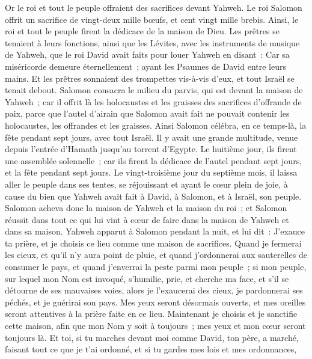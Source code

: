 \begin{multicols}{2}
Or le roi et tout le peuple offraient des sacrifices devant Yahweh.
Le roi Salomon offrit un sacrifice de vingt-deux mille bœufs, et cent vingt mille brebis. Ainsi, le roi et tout le peuple firent la dédicace de la maison de Dieu.
Les prêtres se tenaient à leurs fonctions, ainsi que les Lévites, avec les instruments de musique de Yahweh, que le roi David avait faits pour louer Yahweh en disant~: Car sa miséricorde demeure éternellement~; ayant les Psaumes de David entre leurs mains. Et les prêtres sonnaient des trompettes vis-à-vis d'eux, et tout Israël se tenait debout.
Salomon consacra le milieu du parvis, qui est devant la maison de Yahweh~; car il offrit là les holocaustes et les graisses des sacrifices d'offrande de paix, parce que l'autel d'airain que Salomon avait fait ne pouvait contenir les holocaustes, les offrandes et les graisses.
Ainsi Salomon célébra, en ce temps-là, la fête pendant sept jours, avec tout Israël. Il y avait une grande multitude, venue depuis l'entrée d'Hamath jusqu'au torrent d'Egypte.
Le huitième jour, ils firent une assemblée solennelle~; car ils firent la dédicace de l'autel pendant sept jours, et la fête pendant sept jours.
Le vingt-troisième jour du septième mois, il laissa aller le peuple dans ses tentes, se réjouissant et ayant le cœur plein de joie, à cause du bien que Yahweh avait fait à David, à Salomon, et à Israël, son peuple.
Salomon acheva donc la maison de Yahweh et la maison du roi~; et Salomon réussit dans tout ce qui lui vint à cœur de faire dans la maison de Yahweh et dans sa maison.
Yahweh apparut à Salomon pendant la nuit, et lui dit~: J'exauce ta prière, et je choisis ce lieu comme une maison de sacrifices.
Quand je fermerai les cieux, et qu'il n'y aura point de pluie, et quand j'ordonnerai aux sauterelles de consumer le pays, et quand j'enverrai la peste parmi mon peuple~;
si mon peuple, sur lequel mon Nom est invoqué, s'humilie, prie, et cherche ma face, et s'il se détourne de ses mauvaises voies, alors je l'exaucerai des cieux, je pardonnerai ses péchés, et je guérirai son pays.
Mes yeux seront désormais ouverts, et mes oreilles seront attentives à la prière faite en ce lieu.
Maintenant je choisis et je sanctifie cette maison, afin que mon Nom y soit à toujours~; mes yeux et mon cœur seront toujours là.
Et toi, si tu marches devant moi comme David, ton père, a marché, faisant tout ce que je t'ai ordonné, et si tu gardes mes lois et mes ordonnances,

\end{multicols}
